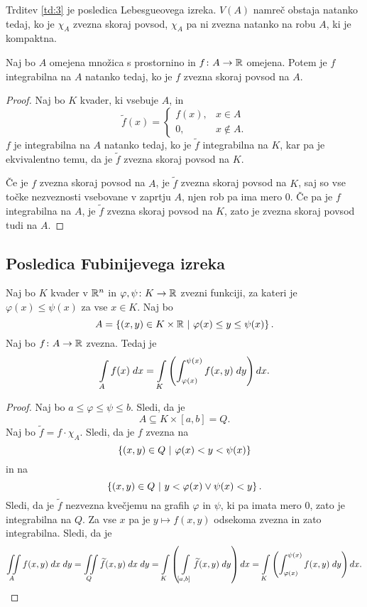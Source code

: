 \begin{opomba}
Trditev \ref{td:3} je posledica Lebesgueovega izreka. $V(A)$ namreč
obstaja natanko tedaj, ko je $\chi_A $ zvezna skoraj povsod,
$\chi_A$ pa ni zvezna natanko na robu $A$, ki je kompaktna.
\end{opomba}

\begin{trditev}
Naj bo $A$ omejena množica s prostornino in $f \colon A \to \mathbb{R}$
omejena. Potem je $f$ integrabilna na $A$ natanko tedaj, ko je $f$
zvezna skoraj povsod na $A$.
\end{trditev}

\begin{proof}
Naj bo $K$ kvader, ki vsebuje $A$, in
\[
\widetilde{f}(x) = \begin{cases}
f(x), &x \in A
\\
0, &x \not \in A.
\end{cases}
\]
$f$ je integrabilna na $A$ natanko tedaj, ko je $\widetilde{f}$
integrabilna na $K$, kar pa je ekvivalentno temu, da je
$\widetilde{f}$ zvezna skoraj povsod na $K$.

Če je $f$ zvezna skoraj povsod na $A$, je $\widetilde{f}$ zvezna
skoraj povsod na $K$, saj so vse točke nezveznosti vsebovane v
zaprtju $A$, njen rob pa ima mero $0$. Če pa je $f$ integrabilna
na $A$, je $\widetilde{f}$ zvezna skoraj povsod na $K$, zato je
zvezna skoraj povsod tudi na $A$.
\end{proof}

\newpage

\subsection{Posledica Fubinijevega izreka}

\begin{trditev}
Naj bo $K$ kvader v $\mathbb{R}^{n}$ in
$\varphi, \psi \colon K \to \mathbb{R}$ zvezni funkciji, za kateri je
$\varphi(x) \leq \psi(x)$ za vse $x \in K$. Naj bo
\[
A = \left\{(x,y) \in K \times \mathbb{R}~\middle\vert~\varphi(x) \leq y \leq \psi(x)\right\}.
\]
Naj bo $f \colon A \to \mathbb{R}$ zvezna. Tedaj je
\[
\int\limits_A f(x)\;dx =
\int\limits_K \left( \int_{\varphi(x)}^{\psi(x)} f(x,y)\;dy\right)dx.
\]
\end{trditev}

\begin{proof}
Naj bo $a \leq \varphi \leq \psi \leq b$. Sledi, da je
\[
A \subseteq K \times [a,b] = Q.
\]
Naj bo $\widetilde{f} = f \cdot \chi_A$. Sledi, da je $f$ zvezna na
\[
\left\{(x,y) \in Q~\middle\vert~\varphi(x) < y < \psi(x)\right\}
\]
in na
\[
\left\{(x,y) \in Q~\middle\vert~y < \varphi(x) \lor \psi(x) < y\right\}.
\]
Sledi, da je $\widetilde{f}$ nezvezna kvečjemu na grafih $\varphi$
in $\psi$, ki pa imata mero $0$, zato je integrabilna na $Q$. Za
vse $x$ pa je $y \mapsto f(x,y)$ odsekoma zvezna in zato
integrabilna. Sledi, da je
\[
\iint\limits_A f(x,y)\;dx\;dy =
\iint\limits_Q \widetilde{f}(x,y)\;dx\;dy =
\int\limits_K \left(\int\limits_{[a,b]} \widetilde{f}(x,y)\;dy\right)dx =
\int\limits_K \left( \int_{\varphi(x)}^{\psi(x)} f(x,y)\;dy\right)dx.
\qedhere
\]
\end{proof}

